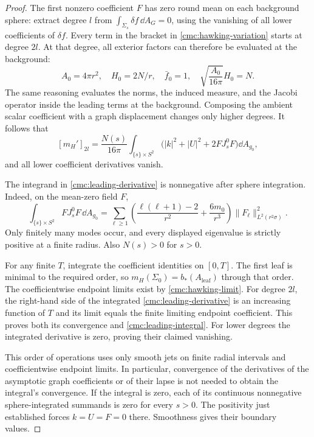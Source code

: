 \begin{proof}
The first nonzero coefficient \(F\) has zero round mean on each
background sphere: extract degree \(l\) from
\(\int_{\Sigma_s}\delta f\,\dd A_G=0\), using the vanishing of all
lower coefficients of \(\delta f\).
Every term in the bracket in \eqref{cmc:hawking-variation} starts at
degree \(2l\).  At that degree, all exterior factors can therefore
be evaluated at the background:
\[
 A_0=4\pi r^2,\quad H_0=2N/r,\quad \bar f_0=1,
 \quad\sqrt{\frac{A_0}{16\pi}}H_0=N.
\]
The same reasoning evaluates the norms, the induced measure, and
the Jacobi operator inside the leading terms at the background.
Composing the ambient scalar coefficient with a graph displacement
changes only higher degrees.
It follows that
\begin{equation}\label{cmc:leading-derivative}
 [m_H']_{2l}
 =\frac{N(s)}{16\pi}\int_{\{s\}\times S^2}
        \bigl(|k|^2+|U|^2+2FJ_s^0F\bigr)\dd A_{g_0},
\end{equation}
and all lower coefficient derivatives vanish.

The integrand in \eqref{cmc:leading-derivative} is nonnegative after
sphere integration.  Indeed, on the mean-zero field \(F\),
\[
 \int_{\{s\}\times S^2}FJ_s^0F\,\dd A_{g_0}
 =\sum_{\ell\ge1}
  \left(\frac{\ell(\ell+1)-2}{r^2}+\frac{6m_0}{r^3}\right)
       \|F_\ell\|_{L^2(r^2\sigma)}^2.
\]
Only finitely many modes occur, and every displayed eigenvalue is
strictly positive at a finite radius.
Also \(N(s)>0\) for \(s>0\).

For any finite \(T\), integrate the coefficient identities on
\([0,T]\).
The first leaf is minimal to the required order, so
\(m_H(\Sigma_0)=b_*(A_{\mathrm{leaf}})\) through that order.
The coefficientwise endpoint limits exist by
\eqref{cmc:hawking-limit}.
For degree \(2l\), the right-hand side of the integrated
\eqref{cmc:leading-derivative} is an increasing function of \(T\)
and its limit equals the finite limiting endpoint coefficient.
This proves both its convergence and
\eqref{cmc:leading-integral}.
For lower degrees the integrated derivative is zero, proving their
claimed vanishing.

This order of operations uses only smooth jets on finite radial
intervals and coefficientwise endpoint limits.
In particular, convergence of the derivatives of the asymptotic
graph coefficients or of their lapse is not needed to obtain the
integral's convergence.
If the integral is zero, each of its continuous nonnegative
sphere-integrated summands is zero for every \(s>0\).
The positivity just established forces \(k=U=F=0\) there.
Smoothness gives their boundary values.
\end{proof}
